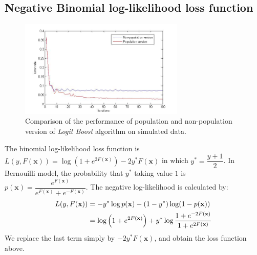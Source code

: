 \documentclass[a4paper,twoside,12pt]{article}
\begin{document}
\subsection{Negative Binomial log-likelihood loss function}

\begin{figure}[ht]\centering
  	\includegraphics[width=0.7\textwidth]{comp_pop_nonPop.jpg}
  	\caption{Comparison of the performance of population and non-population version of \textsl{Logit Boost} algorithm on simulated data.}
  	\label{comp_pop_nonPop}
\end{figure}

The binomial log-likelihood loss function is $L(y, F(\textbf{x})) = \log\left( 1 + e^{2F(\textbf{x})}\right) - 2y^{*}F(\textbf{x})$ in which $y^{*} = \dfrac{y+1}{2}$. In Bernouilli model, the probability that $y^{*}$ taking value $1$ is $p(\textbf{x}) = \dfrac{e^{F(\textbf{x})}}{e^{F(\textbf{x})} + e^{-F(\textbf{x})}}$. The negative log-likelihood is calculated by:
\begin{align}
    L(y, F(\textbf{x})) &= -y^{*}\log p(\textbf{x}) - (1-y^{*})\log(1-p(\textbf{x})) \notag \\
    &= \log\left( 1+e^{2F(\textbf{x})}\right) + y^{*}\log \dfrac{1+e^{-2F(\textbf{x})}}{1+e^{2F(\textbf{x})}} \notag
\end{align}
We replace the last term simply by $-2y^{*}F(\textbf{x})$, and obtain the loss function above.
\end{document}
